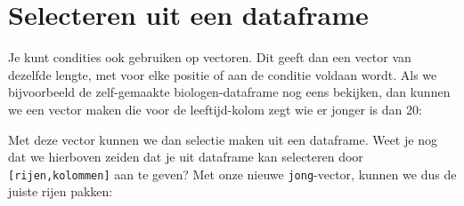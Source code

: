 \documentclass[
  a4paper,
]{scrbook}
\newenvironment{Shaded}{\begin{snugshade}}{\end{snugshade}}
\newcommand{\AttributeTok}[1]{\textcolor[rgb]{0.40,0.45,0.13}{#1}}
\newcommand{\CommentTok}[1]{\textcolor[rgb]{0.37,0.37,0.37}{#1}}
\newcommand{\DecValTok}[1]{\textcolor[rgb]{0.68,0.00,0.00}{#1}}
\newcommand{\FunctionTok}[1]{\textcolor[rgb]{0.28,0.35,0.67}{#1}}
\newcommand{\NormalTok}[1]{\textcolor[rgb]{0.00,0.23,0.31}{#1}}
\newcommand{\OtherTok}[1]{\textcolor[rgb]{0.00,0.23,0.31}{#1}}
\newcommand{\SpecialCharTok}[1]{\textcolor[rgb]{0.37,0.37,0.37}{#1}}
\newcommand{\StringTok}[1]{\textcolor[rgb]{0.13,0.47,0.30}{#1}}
\theoremstyle{definition}
\theoremstyle{remark}
\begin{document}
\begin{Shaded}
\end{Shaded}

\section{Selecteren uit een
dataframe}\label{selecteren-uit-een-dataframe}

Je kunt condities ook gebruiken op vectoren. Dit geeft dan een vector
van dezelfde lengte, met voor elke positie of aan de conditie voldaan
wordt. Als we bijvoorbeeld de zelf-gemaakte biologen-dataframe nog eens
bekijken, dan kunnen we een vector maken die voor de leeftijd-kolom zegt
wie er jonger is dan 20:

\begin{Shaded}
\end{Shaded}

Met deze vector kunnen we dan selectie maken uit een dataframe. Weet je
nog dat we hierboven zeiden dat je uit dataframe kan selecteren door
\texttt{{[}rijen,kolommen{]}} aan te geven? Met onze nieuwe
\texttt{jong}-vector, kunnen we dus de juiste rijen pakken:
\end{document}
